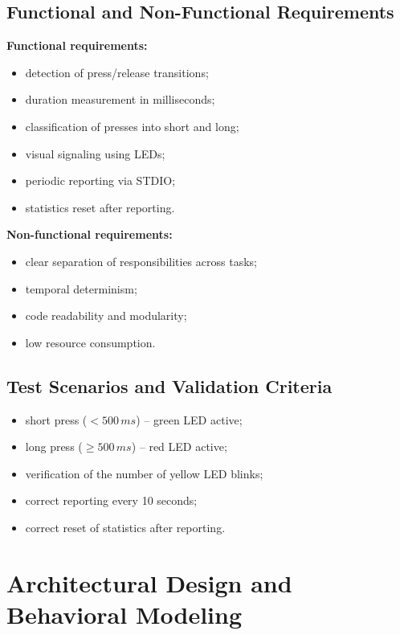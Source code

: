 \documentclass[12pt,a4paper]{article}
\begin{document}
\subsection{Functional and Non-Functional Requirements}

\textbf{Functional requirements:}
\begin{itemize}
    \item detection of press/release transitions;
    \item duration measurement in milliseconds;
    \item classification of presses into short and long;
    \item visual signaling using LEDs;
    \item periodic reporting via STDIO;
    \item statistics reset after reporting.
\end{itemize}

\textbf{Non-functional requirements:}
\begin{itemize}
    \item clear separation of responsibilities across tasks;
    \item temporal determinism;
    \item code readability and modularity;
    \item low resource consumption.
\end{itemize}

\subsection{Test Scenarios and Validation Criteria}
\begin{itemize}
    \item short press ($<500\,ms$) – green LED active;
    \item long press ($\geq500\,ms$) – red LED active;
    \item verification of the number of yellow LED blinks;
    \item correct reporting every 10 seconds;
    \item correct reset of statistics after reporting.
\end{itemize}

\section{Architectural Design and Behavioral Modeling}
\end{document}
